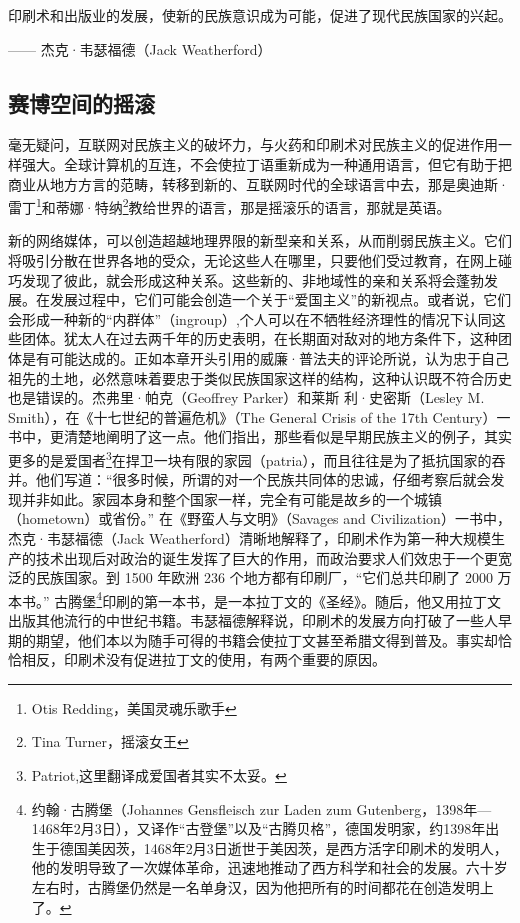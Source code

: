 \begin{tcolorbox}
\kaishu 印刷术和出版业的发展，使新的民族意识成为可能，促进了现代民族国家的兴起。
\begin{flushright}
—— 杰克·韦瑟福德（Jack Weatherford）
\end{flushright}
\end{tcolorbox}

\subsection{赛博空间的摇滚}

毫无疑问，互联网对民族主义的破坏力，与火药和印刷术对民族主义的促进作用一样强大。全球计算机的互连，不会使拉丁语重新成为一种通用语言，但它有助于把商业从地方方言的范畴，转移到新的、互联网时代的全球语言中去，那是奥迪斯·雷丁\footnote{Otis Redding，美国灵魂乐歌手}和蒂娜·特纳\footnote{Tina Turner，摇滚女王}教给世界的语言，那是摇滚乐的语言，那就是英语。

新的网络媒体，可以创造超越地理界限的新型亲和关系，从而削弱民族主义。它们将吸引分散在世界各地的受众，无论这些人在哪里，只要他们受过教育，在网上碰巧发现了彼此，就会形成这种关系。这些新的、非地域性的亲和关系将会蓬勃发展。在发展过程中，它们可能会创造一个关于“爱国主义”的新视点。或者说，它们会形成一种新的“内群体”（ingroup）,个人可以在不牺牲经济理性的情况下认同这些团体。犹太人在过去两千年的历史表明，在长期面对敌对的地方条件下，这种团体是有可能达成的。正如本章开头引用的威廉·普法夫的评论所说，认为忠于自己祖先的土地，必然意味着要忠于类似民族国家这样的结构，这种认识既不符合历史也是错误的。杰弗里·帕克（Geoffrey Parker）和莱斯 利·史密斯（Lesley M. Smith），在《十七世纪的普遍危机》（The General Crisis of the 17th Century）一书中，更清楚地阐明了这一点。他们指出，那些看似是早期民族主义的例子，其实更多的是爱国者\footnote{Patriot,这里翻译成爱国者其实不太妥。}在捍卫一块有限的家园（patria），而且往往是为了抵抗国家的吞并。他们写道：“很多时候，所谓的对一个民族共同体的忠诚，仔细考察后就会发现并非如此。家园本身和整个国家一样，完全有可能是故乡的一个城镇 （hometown）或省份。” 在《野蛮人与文明》（Savages and Civilization）一书中，杰克·韦瑟福德（Jack Weatherford）清晰地解释了，印刷术作为第一种大规模生产的技术出现后对政治的诞生发挥了巨大的作用，而政治要求人们效忠于一个更宽泛的民族国家。到 1500 年欧洲 236 个地方都有印刷厂，“它们总共印刷了 2000 万本书。” 古腾堡\footnote{约翰·古腾堡（Johannes Gensfleisch zur Laden zum Gutenberg，1398年—1468年2月3日），又译作“古登堡”以及“古腾贝格”，德国发明家，约1398年出生于德国美因茨，1468年2月3日逝世于美因茨，是西方活字印刷术的发明人，他的发明导致了一次媒体革命，迅速地推动了西方科学和社会的发展。六十岁左右时，古腾堡仍然是一名单身汉，因为他把所有的时间都花在创造发明上了。}印刷的第一本书，是一本拉丁文的《圣经》。随后，他又用拉丁文出版其他流行的中世纪书籍。韦瑟福德解释说，印刷术的发展方向打破了一些人早期的期望，他们本以为随手可得的书籍会使拉丁文甚至希腊文得到普及。事实却恰恰相反，印刷术没有促进拉丁文的使用，有两个重要的原因。

